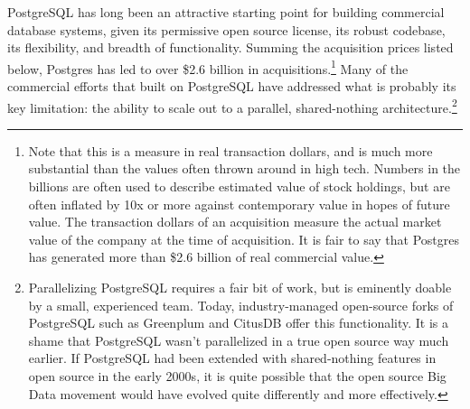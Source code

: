 \documentclass[sigconf,natbib=false]{acmart}
\begin{document}
PostgreSQL has long been an attractive starting point for building commercial database systems, given its permissive open source license, its robust codebase, its flexibility, and breadth of functionality. Summing the acquisition prices listed below, Postgres has led to over \$2.6 billion in acquisitions.\footnote{Note that this is a measure in real transaction dollars, and is much more substantial than the values often thrown around in high tech. Numbers in the billions are often used to describe estimated value of stock holdings, but are often inflated by 10x or more against contemporary value in hopes of future value. The transaction dollars of an acquisition measure the actual market value of the company at the time of acquisition. It is fair to say that Postgres has generated more than \$2.6 billion of real commercial value.} Many of the commercial efforts that built on PostgreSQL have addressed what is probably its key limitation: the ability to scale out to a parallel, shared-nothing architecture.\footnote{Parallelizing PostgreSQL requires a fair bit of work, but is eminently doable by a small, experienced team. Today, industry-managed open-source forks of PostgreSQL such as Greenplum and CitusDB offer this functionality. It is a shame that PostgreSQL wasn't parallelized in a true open source way much earlier. If PostgreSQL had been extended with shared-nothing features in open source in the early 2000s, it is quite possible that the open source Big Data movement would have evolved quite differently and more effectively.}
\end{document}
